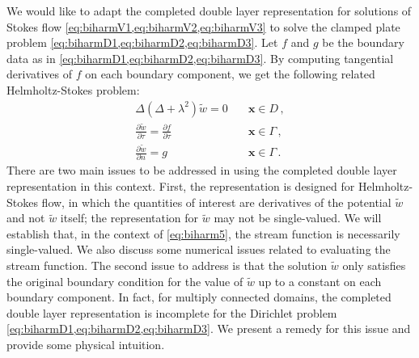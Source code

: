 \documentclass[preprint,12pt]{article}
\def\bx{{\boldsymbol x}}
\begin{document}
We would like to adapt the completed double layer representation
for solutions of Stokes flow \cref{eq:biharmV1,eq:biharmV2,eq:biharmV3} to solve 
the clamped plate problem \cref{eq:biharmD1,eq:biharmD2,eq:biharmD3}.
Let $f$ and $g$ be the boundary data as in \cref{eq:biharmD1,eq:biharmD2,eq:biharmD3}. 
By computing tangential derivatives of $f$ on each
boundary component, we get the following related Helmholtz-Stokes problem:
\begin{align}
 \Delta (\Delta + \lambda^2) \tilde{w}  = 0 &\quad \bx \in D \, ,\nonumber\\
 \frac{\partial \tilde{w}}{\partial \tau} = 
 \frac{\partial f}{\partial \tau} 
&\quad \bx \in \Gamma \label{eq:biharm5} \, ,\\ 
 \frac{\partial \tilde{w}}{\partial n} = g &\quad \bx 
\in \Gamma 
\, . 
\nonumber
\end{align}
There are two main issues to be addressed in using the completed
double layer representation in this context. First,
the representation is designed for 
Helmholtz-Stokes flow, in which the quantities of interest are derivatives
of the potential $\tilde{w}$ and not $\tilde{w}$ itself; the
representation for $\tilde{w}$ may not be single-valued. 
We will establish that, in the context of \cref{eq:biharm5},
the stream function is necessarily single-valued. We also discuss
some numerical issues related to evaluating the stream function.
The second issue to address
is that the solution $\tilde{w}$ only satisfies the original boundary 
condition for the value of $\tilde{w}$ up to a constant on 
each boundary component.
In fact, for multiply connected domains, the completed double layer 
representation is incomplete for the Dirichlet
problem \cref{eq:biharmD1,eq:biharmD2,eq:biharmD3}. We present a remedy for this 
issue and provide some physical intuition.
%
\end{document}
